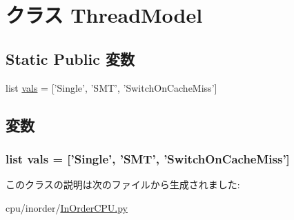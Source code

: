 \hypertarget{classInOrderCPU_1_1ThreadModel}{
\section{クラス ThreadModel}
\label{classInOrderCPU_1_1ThreadModel}
}
\subsection*{Static Public 変数}
\begin{DoxyCompactItemize}
\item 
list \hyperlink{classInOrderCPU_1_1ThreadModel_ac8dfdb1d5e96e93836fb573bc3cd2110}{vals} = \mbox{[}'Single', 'SMT', 'SwitchOnCacheMiss'\mbox{]}
\end{DoxyCompactItemize}


\subsection{変数}
\hypertarget{classInOrderCPU_1_1ThreadModel_ac8dfdb1d5e96e93836fb573bc3cd2110}{
\subsubsection[{vals}]{\setlength{\rightskip}{0pt plus 5cm}list {\bf vals} = \mbox{[}'Single', 'SMT', 'SwitchOnCacheMiss'\mbox{]}}}
\label{classInOrderCPU_1_1ThreadModel_ac8dfdb1d5e96e93836fb573bc3cd2110}


このクラスの説明は次のファイルから生成されました:\begin{DoxyCompactItemize}
\item 
cpu/inorder/\hyperlink{InOrderCPU_8py}{InOrderCPU.py}\end{DoxyCompactItemize}
